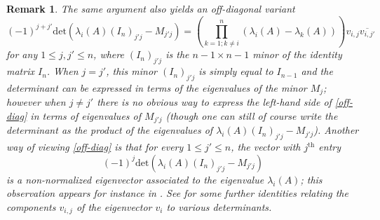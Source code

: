 \documentclass{amsart}
\newtheorem{remark}[lemma]{Remark}
\begin{document}
\begin{remark}
The same argument also yields an off-diagonal variant
\begin{equation}\label{off-diag}
 (-1)^{j+j'} \mathrm{det}(\lambda_i(A) (I_n)_{j'j} - M_{j'j}) = (\prod_{k=1; k \neq i}^n (\lambda_i(A) - \lambda_k(A)) ) v_{i,j} \overline{v_{i,j'}}
\end{equation}
for any $1 \leq j,j' \leq n$, where $(I_n)_{j'j}$ is the $n-1 \times n-1$ minor of the identity matrix $I_n$.  When $j=j'$, this minor $(I_n)_{j'j}$ is simply equal to $I_{n-1}$ and the determinant can be expressed in terms of the eigenvalues of the minor $M_j$; however when $j \neq j'$ there is no obvious way to express the left-hand side of \eqref{off-diag} in terms of eigenvalues of $M_{j'j}$ (though one can still of course write the determinant as the product of the eigenvalues of $\lambda_i(A) (I_n)_{j'j} - M_{j'j}$).  Another way of viewing \eqref{off-diag} is that for every $1 \leq j' \leq n$, the vector with $j^{\mathrm{th}}$ entry
$$ (-1)^{j} \mathrm{det}(\lambda_i(A) (I_n)_{j'j} - M_{j'j}) $$
is a non-normalized eigenvector associated to the eigenvalue $\lambda_i(A)$; this observation appears for instance in \cite[p. 85--86]{gantmacher}.  See \cite{2014arXiv1401.4580V} for some further identities relating the components $v_{i,j}$ of the eigenvector $v_i$ to various determinants.
\end{remark}
\end{document}
